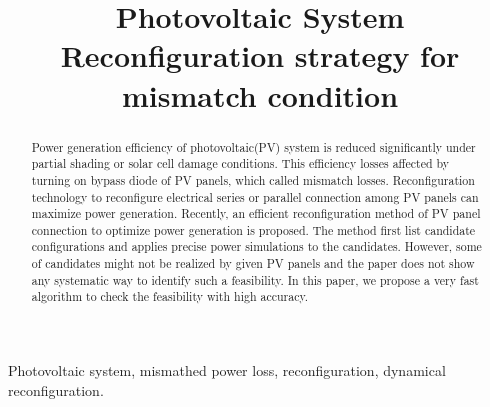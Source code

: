 \documentclass[conference]{IEEEtran}
\begin{document}
\title{Photovoltaic System Reconfiguration strategy for mismatch condition\\
{\footnotesize \textsuperscript{}}}
\author{
\and
{}
\and
{}
}

\maketitle

\begin{abstract}
  Power generation efficiency of photovoltaic(PV) system is reduced significantly under partial shading or solar cell damage  conditions. This efficiency losses affected by turning on bypass diode of PV panels, which called mismatch losses. Reconfiguration technology to reconfigure electrical series or parallel connection among PV panels can maximize power generation. Recently, an efficient reconfiguration method of PV panel connection to optimize power generation is proposed. The method first list candidate configurations and applies precise power simulations to the candidates. However, some of candidates might not be realized by given PV panels and the paper does not show any systematic way to identify such a feasibility. In this paper, we propose a very fast algorithm to check the feasibility with high accuracy.
\end{abstract}

\begin{IEEEkeywords}
  Photovoltaic system, mismathed power loss, reconfiguration, dynamical reconfiguration.
\end{IEEEkeywords}
\end{document}
